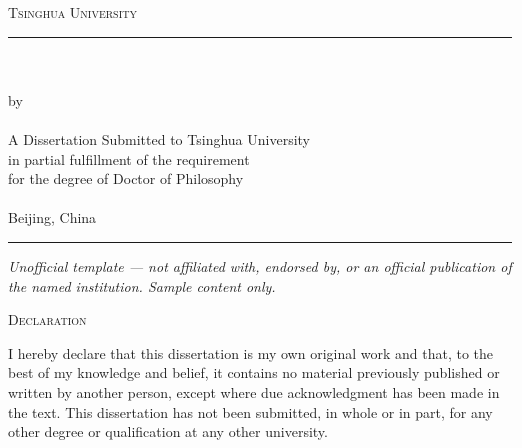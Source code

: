 \documentclass[12pt,a4paper,oneside]{book}
\begin{document}
\frontmatter

\begin{titlepage}
\thispagestyle{empty}
\begin{center}

\vspace*{30mm}

{\LARGE\scshape\color{tsinghuapurple}Tsinghua University}\\[8mm]

{\color{tsinghuapurple}\rule{0.45\textwidth}{0.8pt}}\\[20mm]

{\LARGE\bfseries\tsinghuatitle}\\[25mm]

{\large by}\\[6mm]

{\Large\tsinghuaauthor}\\[30mm]

{\large A Dissertation Submitted to Tsinghua University\\
in partial fulfillment of the requirement\\
for the degree of Doctor of Philosophy}\\[20mm]

{\large\tsinghuadept}\\[4mm]
{\large Beijing, China}\\[4mm]
{\large\tsinghuadate}

\vfill

{\color{tsinghuapurple}\rule{0.45\textwidth}{0.8pt}}

\vfill
{\footnotesize\itshape Unofficial template --- not affiliated with, endorsed by, or an official publication of the named institution. Sample content only.}
\end{center}
\end{titlepage}

\thispagestyle{empty}
\vspace*{40mm}

\begin{center}
{\LARGE\scshape\color{tsinghuapurple}Declaration}
\end{center}

\vspace{20mm}

I hereby declare that this dissertation is my own original work and that,
to the best of my knowledge and belief, it contains no material previously
published or written by another person, except where due acknowledgment
has been made in the text. This dissertation has not been submitted, in
whole or in part, for any other degree or qualification at any other
university.
\end{document}
